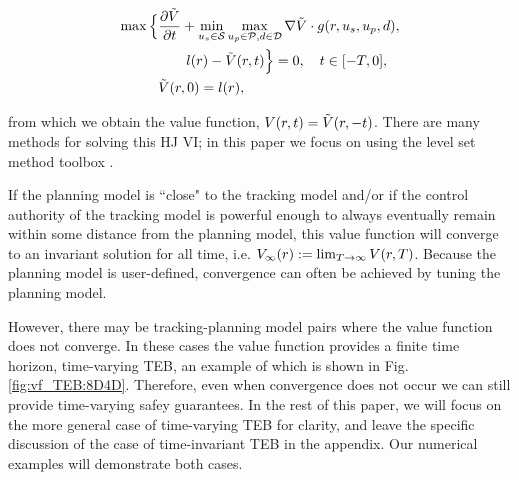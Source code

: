 \begin{align}
\max \Big\{&\frac{\partial \tilde\valfunc}{\partial \tvar} + \min_{\tctrl\in\tset} \max_{\pctrl\in\pset, \dstb\in\dset} \nabla \tilde\valfunc \cdot \rdyn(\rstate, \tctrl, \pctrl, \dstb), \nonumber \\
&\qquad\errfunc(\rstate) - \tilde\valfunc(\rstate, \tvar)\Big\} = 0, \quad \tvar \in [-T, 0], \label{eq:HJVI} \\
&\tilde\valfunc(\rstate, 0) = \errfunc(\rstate), \nonumber
\end{align}

\noindent from which we obtain the value function, $V(r, t) = \tilde{V}(r, -t)$. There are many methods for solving this HJ VI; in this paper we focus on using the level set method toolbox \cite{Mitchell07c}.

If the planning model is ``close" to the tracking model and/or if the control authority of the tracking model is powerful enough to always eventually remain within some distance from the planning model, this value function will converge to an invariant solution for all time, i.e. $V_\infty(r) := \lim_{T\rightarrow\infty} V(r, T)$. 
Because the planning model is user-defined, convergence can often be achieved by tuning the planning model.

However, there may be tracking-planning model pairs where the value function does not converge.  
In these cases the value function provides a finite time horizon, time-varying TEB, an example of which is shown in Fig. \ref{fig:vf_TEB:8D4D}.
Therefore, even when convergence does not occur we can still provide time-varying safey guarantees.
In the rest of this paper, we will focus on the more general case of time-varying TEB for clarity, and leave the specific discussion of the case of time-invariant TEB in the appendix.
Our numerical examples will demonstrate both cases.


